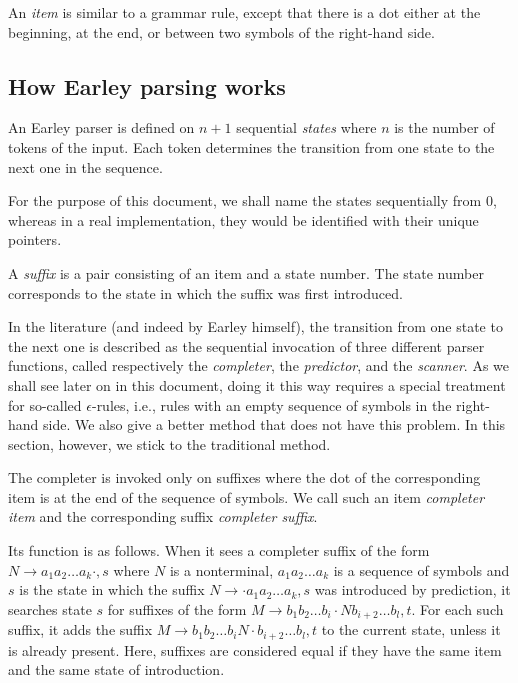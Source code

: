 \documentclass[11pt]{article}
\def\ra{\rightarrow}
\begin{document}
An \emph{item} is similar to a grammar rule, except that there is a
dot either at the beginning, at the end, or between two symbols of the
right-hand side.

\subsection{How Earley parsing works}

An Earley parser is defined on $n+1$ sequential \emph{states} where
$n$ is the number of tokens of the input.  Each token determines the
transition from one state to the next one in the sequence.

For the purpose of this document, we shall name the states
sequentially from $0$, whereas in a real implementation, they would be
identified with their unique pointers. 

A \emph{suffix} is a pair consisting of an item and a state number.
The state number corresponds to the state in which the suffix was
first introduced. 

In the literature (and indeed by Earley himself), the transition from
one state to the next one is described as the sequential invocation of
three different parser functions, called respectively the
\emph{completer}, the \emph{predictor}, and the \emph{scanner}.  As we
shall see later on in this document, doing it this way requires a
special treatment for so-called $\epsilon$-rules, i.e., rules with an
empty sequence of symbols in the right-hand side.  We also give a
better method that does not have this problem.  In this section,
however, we stick to the traditional method.

The completer is invoked only on suffixes where the dot of the
corresponding item is at the end of the sequence of symbols.  We call
such an item \emph{completer item} and the corresponding suffix
\emph{completer suffix}.  

Its function is as follows.  When it sees a completer suffix of the
form $N \ra a_1 a_2 \ldots a_k \cdot, s$ where $N$ is a nonterminal,
$a_1 a_2 \ldots a_k$ is a sequence of symbols and $s$ is the state in
which the suffix $N \ra \cdot a_1 a_2 \ldots a_k, s$ was introduced by
prediction, it searches state $s$ for suffixes of the form 
$M \ra b_1 b_2 \ldots b_i \cdot N b_{i+2} \ldots b_l, t$.  For each
such suffix, it adds the suffix $M \ra b_1 b_2 \ldots b_i N \cdot
b_{i+2} \ldots b_l, t$ to the current state, unless it is already
present.  Here, suffixes are considered equal if they have the same
item and the same state of introduction.  
\end{document}
